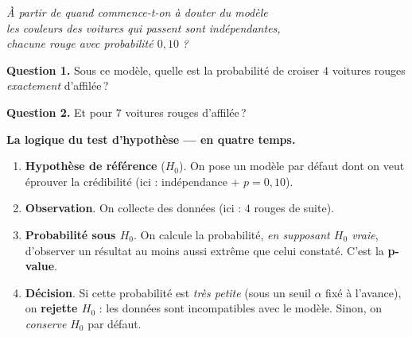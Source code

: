 \medskip

\begin{center}
\begin{mdframed}[backgroundcolor=ThemeLight, linecolor=Theme,
  linewidth=1.5pt, innertopmargin=10pt, innerbottommargin=10pt]
\centering\large\itshape
À partir de quand commence-t-on à douter du modèle\\
\og les couleurs des voitures qui passent sont indépendantes,\\
chacune rouge avec probabilité $0{,}10$\,\fg{}\,?
\end{mdframed}
\end{center}

\textbf{Question 1.} Sous ce modèle, quelle est la probabilité de croiser $4$ voitures rouges \emph{exactement} d'affilée\,?


\textbf{Question 2.} Et pour $7$ voitures rouges d'affilée\,?


\medskip

\begin{mdframed}[backgroundcolor=ThemeLight, linecolor=Theme,
  linewidth=1.5pt, innertopmargin=10pt, innerbottommargin=10pt]
\textbf{La logique du test d'hypothèse --- en quatre temps.}
\begin{enumerate}
  \item \textbf{Hypothèse de référence} ($H_0$). On pose un modèle \og par défaut \fg{} dont on veut éprouver la crédibilité (ici : indépendance + $p=0{,}10$).
  \item \textbf{Observation}. On collecte des données (ici : $4$ rouges de suite).
  \item \textbf{Probabilité sous $H_0$}. On calcule la probabilité, \emph{en supposant $H_0$ vraie}, d'observer un résultat \og au moins aussi extrême \fg{} que celui constaté. C'est la \textbf{p-value}.
  \item \textbf{Décision}. Si cette probabilité est \emph{très petite} (sous un seuil $\alpha$ fixé à l'avance), on \textbf{rejette $H_0$} : les données sont incompatibles avec le modèle. Sinon, on \emph{conserve} $H_0$ par défaut.
\end{enumerate}
\end{mdframed}

